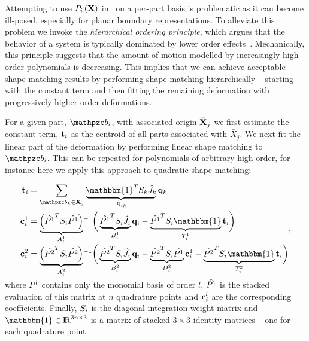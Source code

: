 Attempting to use $P_i\left(\mathbf{X} \right)$ in~ on a per-part basis is problematic as it can become ill-posed, especially for planar boundary representations. 
To alleviate this problem we invoke the \emph{hierarchical ordering principle}, which argues that the behavior of a system is typically 
dominated by lower order effects~\cite{li2006regularities}. 
Mechanically, this principle suggests that the amount of motion modelled by increasingly high-order polynomials is decreasing. 
This implies that we can achieve acceptable shape matching results by performing shape matching hierarchically -- starting with the constant term and then 
fitting the remaining deformation with progressively higher-order deformations. 

For a given part, $\prt_i$, with associated origin $\bar{\mathbf{X}}_j$ we first estimate the constant term, $\mathbf{t}_i$ as the centroid of all parts associated with $\bar{X}_j$.
We next fit the linear part of the deformation by performing linear shape matching to $\prt_i$. 
This can be repeated for polynomials of arbitrary high order, for instance here we apply this approach to quadratic shape matching:

\begin{equation}
    \begin{split}
        \tr_i  & = \sum_{\prt_k \in \bar{\refX}_j} \underbrace{\mathbbm{1}^T\wt_k \samp{\Jnurbs}_k}_{B_{ik}}\vc{q}_k \\
        \vc{c}_i^1 & = \smash{\underbrace{\left(\samp{\Pmat^1}^T\wt_i\samp{\Pmat^1}\right)}_{A^1_i}}^{-1}\bigg(\underbrace{\samp{\Pmat^1}^T\wt_i\samp{\Jnurbs}_i}_{B^1_i}\vc{q}_i-\underbrace{\samp{\Pmat^1}^T\wt_i\mathbbm{1}}_{T^1_i}\tr_i\bigg)\\
        \vc{c}_i^2 & = \smash{\underbrace{\left(\samp{\Pmat^2}^T\wt_i\samp{\Pmat^2}\right)}_{A^2_i}}^{-1}\bigg(\underbrace{\samp{\Pmat^2}^T\wt_i\samp{\Jnurbs}_i}_{B^2_i}\vc{q}_i-\underbrace{\samp{\Pmat^2}^T\wt_i\samp{\Pmat^1}}_{D^2_i}\vc{c}_i^1 - \underbrace{\samp{\Pmat^2}^T\wt_i\mathbbm{1}}_{T^2_i}\tr_i\bigg)
    \end{split},
    \label{eq:hfit} 
\end{equation} where $P^l$ contains only the monomial basis of order $l$,  $\hat{P^1}$ is the stacked evaluation of this matrix at $n$ quadrature points and $\mathbf{c}^l_i$ are the corresponding coefficients. 
Finally, $S_i$ is the diagonal integration weight matrix and $\mathbbm{1}\in\real^{3n\times3}$ is a matrix of stacked $3\times3$ identity matrices -- one for each quadrature point.


